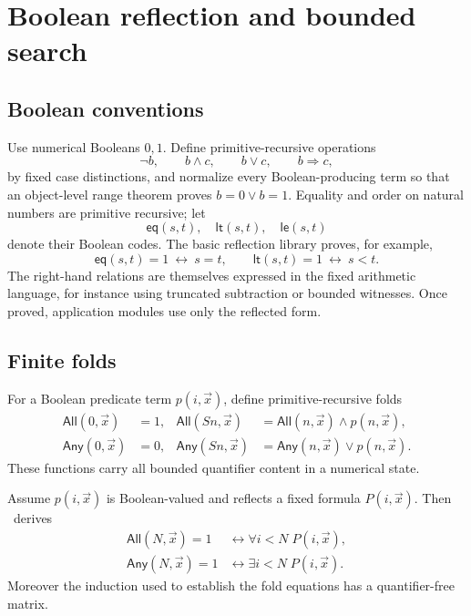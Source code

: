 \section{Boolean reflection and bounded search}\label{sec:boolean-search}

\subsection{Boolean conventions}

Use numerical Booleans \(0,1\).  Define primitive-recursive operations
\[
 \neg b,\qquad b\wedge c,\qquad b\vee c,\qquad b\Rightarrow c,
\]
by fixed case distinctions, and normalize every Boolean-producing term so that an object-level range theorem proves \(b=0\vee b=1\).  Equality and order on natural numbers are primitive recursive; let
\[
 \mathsf{eq}(s,t),\quad \mathsf{lt}(s,t),\quad \mathsf{le}(s,t)
\]
denote their Boolean codes.  The basic reflection library proves, for example,
\[
 \mathsf{eq}(s,t)=1\ \leftrightarrow\ s=t,
 \qquad
 \mathsf{lt}(s,t)=1\ \leftrightarrow\ s<t.
\]
The right-hand relations are themselves expressed in the fixed arithmetic language, for instance using truncated subtraction or bounded witnesses.  Once proved, application modules use only the reflected form.

\subsection{Finite folds}

For a Boolean predicate term \(p(i,\vec x)\), define primitive-recursive folds
\begin{align*}
 \mathsf{All}(0,\vec x)&=1,
 &\mathsf{All}(S n,\vec x)&=\mathsf{All}(n,\vec x)\wedge p(n,\vec x),\\
 \mathsf{Any}(0,\vec x)&=0,
 &\mathsf{Any}(S n,\vec x)&=\mathsf{Any}(n,\vec x)\vee p(n,\vec x).
\end{align*}
These functions carry all bounded quantifier content in a numerical state.

\begin{theorem}\label{thm:fold-reflection}
Assume \(p(i,\vec x)\) is Boolean-valued and reflects a fixed formula \(P(i,\vec x)\).  Then \iPRA\ derives
\begin{align*}
 \mathsf{All}(N,\vec x)=1
   &\leftrightarrow \forall i<N\;P(i,\vec x),\\
 \mathsf{Any}(N,\vec x)=1
   &\leftrightarrow \exists i<N\;P(i,\vec x).
\end{align*}
Moreover the induction used to establish the fold equations has a quantifier-free matrix.
\end{theorem}

